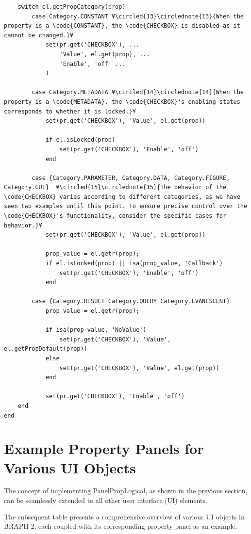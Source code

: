 \documentclass{tufte-handout}
\begin{document}
\begin{lstlisting}
	switch el.getPropCategory(prop)
		case Category.CONSTANT ¥\circled{13}\circlednote{13}{When the property is a \code{CONSTANT}, the \code{CHECKBOX} is disabled as it cannot be changed.}¥
			set(pr.get('CHECKBOX'), ...
				'Value', el.get(prop), ...
				'Enable', 'off' ...
			)

		case Category.METADATA ¥\circled{14}\circlednote{14}{When the property is a \code{METADATA}, the \code{CHECKBOX}'s enabling status corresponds to whether it is locked.}¥
			set(pr.get('CHECKBOX'), 'Value', el.get(prop))

			if el.isLocked(prop)
				set(pr.get('CHECKBOX'), 'Enable', 'off')
			end

		case {Category.PARAMETER, Category.DATA, Category.FIGURE, Category.GUI}  ¥\circled{15}\circlednote{15}{The behavior of the \code{CHECKBOX} varies according to different categories, as we have seen two examples until this point. To ensure precise control over the \code{CHECKBOX}'s functionality, consider the specific cases for behavior.}¥
			set(pr.get('CHECKBOX'), 'Value', el.get(prop))

			prop_value = el.getr(prop);
			if el.isLocked(prop) || isa(prop_value, 'Callback')
				set(pr.get('CHECKBOX'), 'Enable', 'off')
			end

		case {Category.RESULT Category.QUERY Category.EVANESCENT}
			prop_value = el.getr(prop);

			if isa(prop_value, 'NoValue')
				set(pr.get('CHECKBOX'), 'Value', el.getPropDefault(prop))
			else
				set(pr.get('CHECKBOX'), 'Value', el.get(prop))
			end

			set(pr.get('CHECKBOX'), 'Enable', 'off')
	end
end

\end{lstlisting}

\clearpage

\section{Example Property Panels for Various UI Objects}

The concept of implementing PanelPropLogical, as shown in the previous section, can be seamlessly extended to all other user interface (UI) elements.

The subsequent table presents a comprehensive overview of various UI objects in BRAPH 2, each coupled with its corresponding property panel as an example.
\end{document}
